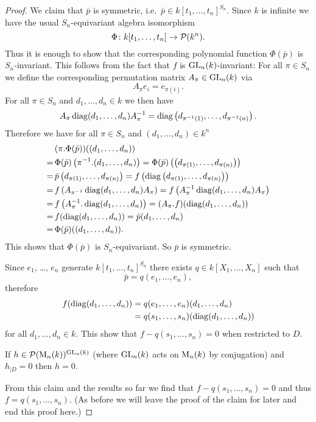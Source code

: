 \begin{proof}
  We claim that $\bar{p}$ is symmetric, i.e.\ $\bar{p} \in k[t_1, \dotsc, t_n]^{S_n}$. Since $k$ is infinite we have the usual $S_n$-equivariant algebra isomorphism
  \[
  \Phi \colon k[t_1, \dotsc, t_n] \to \mathcal{P}(k^n).
  \]
  Thus it is enough to show that the corresponding polynomial function $\Phi(\bar{p})$ is $S_n$-invariant. This follows from the fact that $f$ is $\operatorname{GL}_n(k)$-invariant: For all $\pi \in S_n$ we define the corresponding permutation matrix $A_\pi \in \operatorname{GL}_n(k)$ via
  \[
    A_\pi e_i = e_{\pi(i)}.
  \]
  For all $\pi \in S_n$ and $d_1, \dotsc, d_n \in k$ we then have
  \[
    A_\pi \operatorname{diag}(d_1, \dotsc, d_n) A_\pi^{-1}
    = \operatorname{diag}\left(d_{\pi^{-1}(1)}, \dotsc, d_{\pi^{-1}(n)}\right).
  \]
  Therefore we have for all $\pi \in S_n$ and $(d_1, \dotsc, d_n) \in k^n$
  \begin{align*}
    &\,(\pi.\Phi(\bar{p}))((d_1, \dotsc, d_n)) \\
    =&\, \Phi(\bar{p})\left(\pi^{-1}.(d_1, \dotsc, d_n)\right)
    = \Phi(\bar{p})\left(\left(d_{\pi(1)}, \dotsc, d_{\pi(n)}\right)\right) \\
    =&\, \bar{p}\left(d_{\pi(1)}, \dotsc, d_{\pi(n)}\right)
    = f\left(\operatorname{diag}\left(d_{\pi(1)}, \dotsc, d_{\pi(n)}\right)\right) \\
    =&\, f\left(A_{\pi^{-1}} \operatorname{diag}(d_1, \dotsc, d_n) A_\pi\right)
    = f\left(A_\pi^{-1} \operatorname{diag}(d_1, \dotsc, d_n) A_\pi\right) \\
    =&\, f\left(A_\pi^{-1}.\operatorname{diag}(d_1, \dotsc, d_n)\right)
    = (A_\pi.f)(\operatorname{diag}(d_1, \dotsc, d_n)) \\
    =&\, f(\operatorname{diag}(d_1, \dotsc, d_n))
    = \bar{p}(d_1, \dotsc, d_n) \\
    =&\, \Phi(\bar{p})((d_1, \dotsc, d_n)).
  \end{align*}
  This shows that $\Phi(\bar{p})$ is $S_n$-equivariant. So $\bar{p}$ is symmetric.
  
  Since $e_1$, \dots, $e_n$ generate $k[t_1, \dotsc, t_n]^{S_n}$ there exists $q \in k[X_1, \dotsc, X_n]$ such that
  \[
    \bar{p} = q(e_1, \dotsc, e_n),
  \]
  therefore
  \begin{align*}
    f(\operatorname{diag}(d_1, \dotsc, d_n))
    &= q(e_1, \dotsc, e_n)(d_1, \dotsc, d_n) \\
    &= q(s_1, \dotsc, s_n)(\operatorname{diag}(d_1, \dotsc, d_n))
  \end{align*}
  for all $d_1, \dotsc, d_n \in k$. This show that $f-q(s_1, \dotsc, s_n) = 0$ when restricted to $D$.
  
  \begin{claim}
    If $h \in \mathcal{P}(\operatorname{M}_n(k))^{\operatorname{GL}_n(k)}$ (where $\operatorname{GL}_n(k)$ acts on $\operatorname{M}_n(k)$ by conjugation) and $h_{|D} = 0$ then $h = 0$.
  \end{claim}

  From this claim and the results so far we find that $f - q(s_1, \dotsc, s_n) = 0$ and thus $f = q(s_1, \dotsc, s_n)$. (As before we will leave the proof of the claim for later and end this proof here.)
\end{proof}


